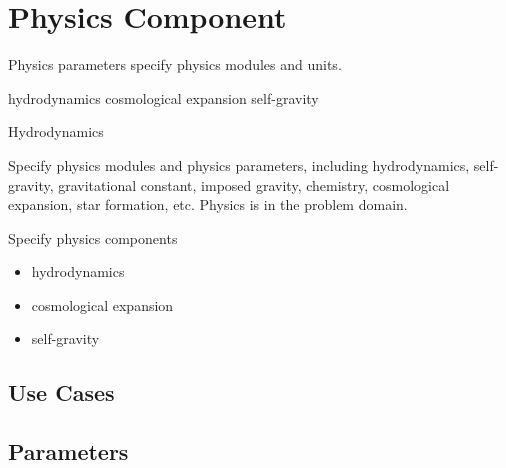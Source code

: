 
\section{Physics Component} \label{s:component-physics}


Physics parameters specify physics modules and units.

 hydrodynamics
  cosmological expansion
 self-gravity

Hydrodynamics


Specify physics modules and physics parameters, including
hydrodynamics, self-gravity, gravitational constant, imposed gravity,
chemistry, cosmological expansion, star formation, etc.  Physics is in
the problem domain.

Specify physics components

\begin{itemize}
\item hydrodynamics
\item  cosmological expansion
\item self-gravity
\end{itemize}

\subsection{Use Cases}
\subsection{Parameters}
